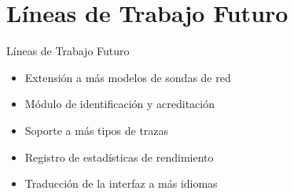 \section{Líneas de Trabajo Futuro}

\begin{frame}{Líneas de Trabajo Futuro}
  \begin{itemize}[<alert@+>]
    \item Extensión a más modelos de sondas de red
    \item Módulo de identificación y acreditación
    \item Soporte a más tipos de trazas
    \item Registro de estadísticas de rendimiento
    \item Traducción de la interfaz a más idiomas
  \end{itemize}
\end{frame}

